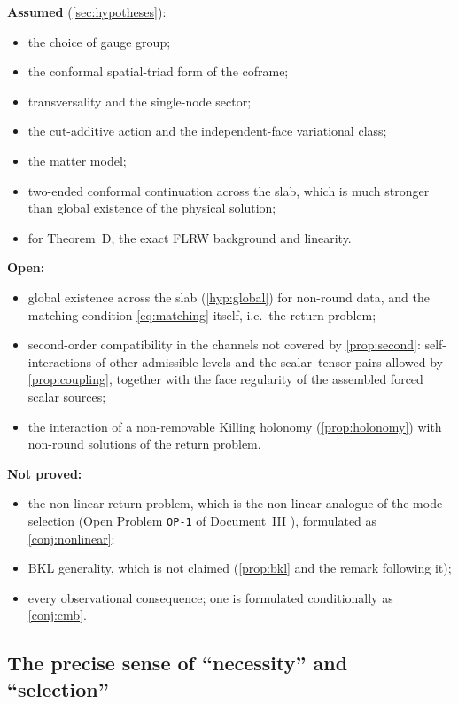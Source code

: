 \documentclass[11pt]{article}
\theoremstyle{canonmath}
\theoremstyle{canonpostulate}
\theoremstyle{canonproposition}
\theoremstyle{canonmath}
\theoremstyle{canonproposition}
\begin{document}
\textbf{Assumed} (\cref{sec:hypotheses}):
\begin{itemize}
\item the choice of gauge group;
\item the conformal spatial-triad form of the coframe;
\item transversality and the single-node sector;
\item the cut-additive action and the independent-face variational class;
\item the matter model;
\item two-ended conformal continuation across the slab, which is much stronger than global existence of the physical solution;
\item for Theorem~D, the exact FLRW background and linearity.
\end{itemize}

\textbf{Open:}
\begin{itemize}
\item global existence across the slab (\ref{hyp:global}) for non-round data, and the matching condition \eqref{eq:matching} itself, i.e.\ the return problem;
\item second-order compatibility in the channels not covered by \cref{prop:second}: self-interactions of other admissible levels and the scalar--tensor pairs allowed by \cref{prop:coupling}, together with the face regularity of the assembled forced scalar sources;
\item the interaction of a non-removable Killing holonomy (\cref{prop:holonomy}) with non-round solutions of the return problem.
\end{itemize}

\textbf{Not proved:}
\begin{itemize}
\item the non-linear return problem, which is the non-linear analogue of the mode selection (Open Problem \texttt{OP-1} of Document~III \cite{DocIII}), formulated as \cref{conj:nonlinear};
\item BKL generality, which is not claimed (\cref{prop:bkl} and the remark following it);
\item every observational consequence; one is formulated conditionally as \cref{conj:cmb}.
\end{itemize}

\subsection*{The precise sense of ``necessity'' and ``selection''}
\end{document}
